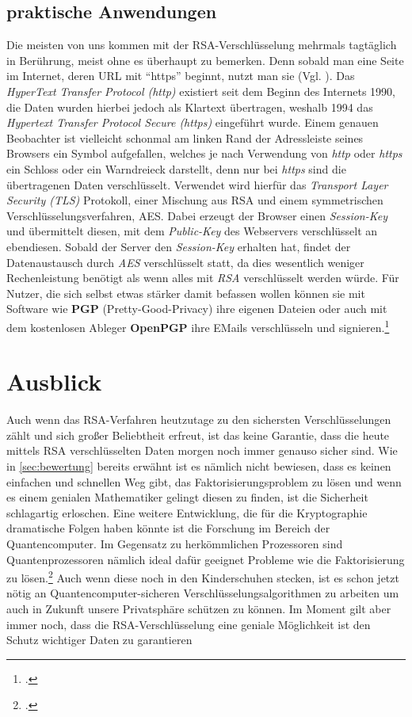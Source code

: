 \documentclass{scrarticle} %
\begin{document}
    \subsection{praktische Anwendungen}
        Die meisten von uns kommen mit der RSA-Verschlüsselung mehrmals tagtäglich in Berührung, meist ohne es überhaupt zu bemerken. Denn sobald man eine Seite im Internet, deren URL mit \enquote{https} beginnt, nutzt man sie (Vgl. \cite{httpsblog}). Das \emph{HyperText Transfer Protocol (http)} existiert seit dem Beginn des Internets 1990, die Daten wurden hierbei jedoch als Klartext übertragen, weshalb 1994 das \emph{Hypertext Transfer Protocol Secure (https)} eingeführt wurde. Einem genauen Beobachter ist vielleicht schonmal am linken Rand der Adressleiste seines Browsers ein Symbol aufgefallen, welches je nach Verwendung von \emph{http} oder \emph{https} ein Schloss oder ein Warndreieck darstellt, denn nur bei \emph{https} sind die übertragenen Daten verschlüsselt. Verwendet wird hierfür das \emph{Transport Layer Security (TLS)} Protokoll, einer Mischung aus RSA und einem symmetrischen Verschlüsselungsverfahren, AES. Dabei erzeugt der Browser einen \emph{Session-Key} und übermittelt diesen, mit dem \emph{Public-Key} des Webservers verschlüsselt an ebendiesen. Sobald der Server den \emph{Session-Key} erhalten hat, findet der Datenaustausch durch \emph{AES} verschlüsselt statt, da dies wesentlich weniger Rechenleistung benötigt als wenn alles mit \emph{RSA} verschlüsselt werden würde.
        Für Nutzer, die sich selbst etwas stärker damit befassen wollen können sie mit Software wie \textbf{PGP} (Pretty-Good-Privacy) ihre eigenen Dateien oder auch mit dem kostenlosen Ableger \textbf{OpenPGP} ihre EMails verschlüsseln und signieren.\footcite[Vgl.][]{zotero-48}
        
    \section{Ausblick}
        Auch wenn das RSA-Verfahren heutzutage zu den sichersten Verschlüsselungen zählt und sich großer Beliebtheit erfreut, ist das keine Garantie, dass die heute mittels RSA verschlüsselten Daten morgen noch immer genauso sicher sind. Wie in \ref{sec:bewertung} bereits erwähnt ist es nämlich nicht bewiesen, dass es keinen einfachen und schnellen Weg gibt, das Faktorisierungsproblem zu lösen und wenn es einem genialen Mathematiker gelingt diesen zu finden, ist die Sicherheit schlagartig erloschen. Eine weitere Entwicklung, die für die Kryptographie dramatische Folgen haben könnte ist die Forschung im Bereich der Quantencomputer. Im Gegensatz zu herkömmlichen Prozessoren sind Quantenprozessoren nämlich ideal dafür geeignet Probleme wie die Faktorisierung zu lösen.\footcite[Vgl.][]{wiedmann} Auch wenn diese noch in den Kinderschuhen stecken, ist es schon jetzt nötig an Quantencomputer-sicheren Verschlüsselungsalgorithmen zu arbeiten um auch in Zukunft unsere Privatsphäre schützen zu können. Im Moment gilt aber immer noch, dass die RSA-Verschlüsselung eine geniale Möglichkeit ist den Schutz wichtiger Daten zu garantieren

    \newpage
    \printbibliography
    \newpage
    
\end{document}
